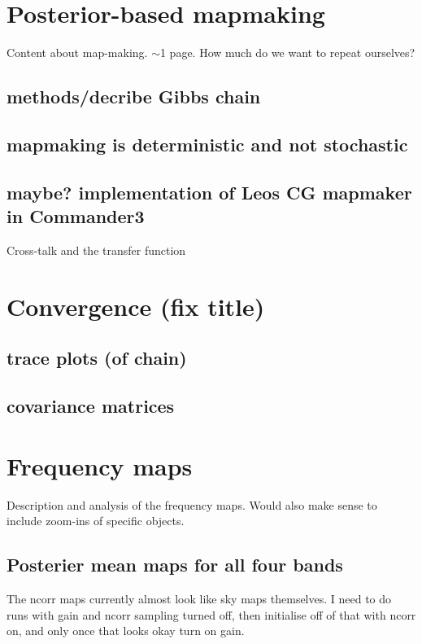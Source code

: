 \documentclass{aa}
\newcommand{\comment}[1]{{\color{teal}#1}}
\begin{document}
%
\section{Posterior-based mapmaking}
\label{sec:mapmaking}
\comment{Content about map-making. $\sim$1 page. How much do we want to repeat ourselves?}
\subsection{methods/decribe Gibbs chain}
\subsection{mapmaking is deterministic and not stochastic}
\subsection{\comment{maybe?} implementation of Leos CG mapmaker in Commander3}
\comment{Cross-talk and the transfer function}

%
\section{Convergence (fix title)}
\label{sec:convergence}
\subsection{trace plots (of chain)}
\subsection{covariance matrices}

%
\section{Frequency maps}
\label{sec:frequency-maps}
\comment{Description and analysis of the frequency maps. Would also make sense to include zoom-ins of specific objects.}
\subsection{Posterier mean maps for all four bands}
\comment{The ncorr maps currently almost look like sky maps themselves. I need to do runs with gain and ncorr sampling turned off, then initialise off of that with ncorr on, and only once that looks okay turn on gain. }
\end{document}

